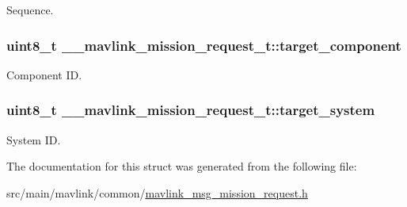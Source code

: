 Sequence. 

\hypertarget{struct____mavlink__mission__request__t_a3bef9f78c3256322231456b15601f1a6}{
\subsubsection[{target\+\_\+component}]{\setlength{\rightskip}{0pt plus 5cm}uint8\+\_\+t \+\_\+\+\_\+mavlink\+\_\+mission\+\_\+request\+\_\+t\+::target\+\_\+component}}\label{struct____mavlink__mission__request__t_a3bef9f78c3256322231456b15601f1a6}


Component I\+D. 

\hypertarget{struct____mavlink__mission__request__t_a8e2bdf5722c43082dfccd49839f7da43}{
\subsubsection[{target\+\_\+system}]{\setlength{\rightskip}{0pt plus 5cm}uint8\+\_\+t \+\_\+\+\_\+mavlink\+\_\+mission\+\_\+request\+\_\+t\+::target\+\_\+system}}\label{struct____mavlink__mission__request__t_a8e2bdf5722c43082dfccd49839f7da43}


System I\+D. 



The documentation for this struct was generated from the following file\+:\begin{DoxyCompactItemize}
\item 
src/main/mavlink/common/\hyperlink{mavlink__msg__mission__request_8h}{mavlink\+\_\+msg\+\_\+mission\+\_\+request.\+h}\end{DoxyCompactItemize}

